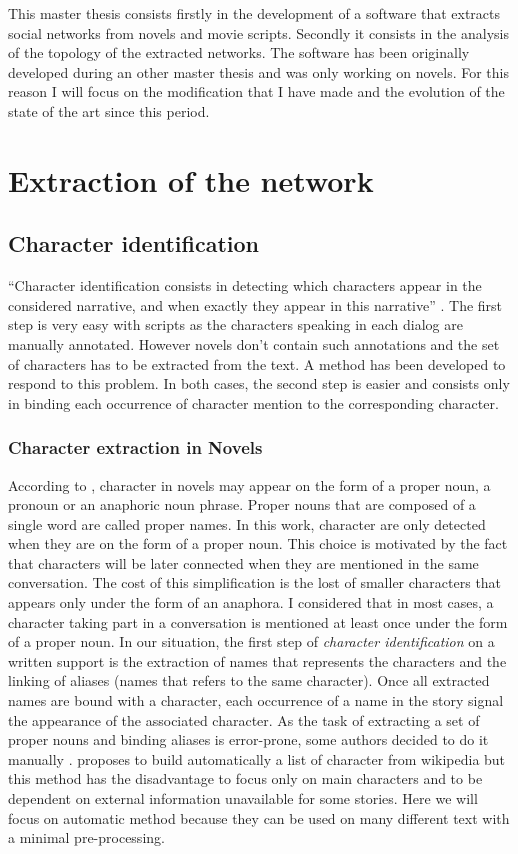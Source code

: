 \documentclass[a4paper, 12pt]{report}
\begin{document}
This master thesis consists firstly in the development of a software that extracts social networks from novels and movie scripts. Secondly it consists in the analysis of the topology of the extracted networks. The software has been originally developed during an other master thesis \citep{original} and was only working on novels. For this reason I will focus on the modification that I have made and the evolution of the state of the art since this period. 


\chapter{Extraction of the network}
\section{Character identification}
``Character identification consists in detecting which characters appear in the considered narrative, and when exactly they appear in this narrative'' \citep{fiction}. The first step is very easy with scripts as the characters speaking in each dialog are manually annotated.
However novels don't contain such annotations and the set of characters has to be extracted from the text. A method has been developed to respond to this problem. In both cases, the second step is easier and consists only in binding each occurrence of character mention to the corresponding character.

\subsection{Character extraction in Novels}
According to \cite{fiction},  character in novels may appear on the form of a proper noun, a pronoun or an anaphoric noun phrase. Proper nouns that are composed of a single word are called proper names. In this work, character are only detected when they are on the form of a proper noun. This choice is motivated by the fact that characters will be later connected when they are mentioned in the same conversation. The cost of this simplification is the lost of smaller characters that appears only under the form of an anaphora. I considered that in most cases, a character taking part in a conversation is mentioned at least once under the form of a proper noun. In our situation, the first step of \textit{character identification} on a written support is the extraction of names that represents the characters and the linking of aliases (names that refers to the same character). Once all extracted names are bound with a character, each occurrence of a name in the story signal the appearance of the associated character. As the task of extracting a set of proper nouns and binding aliases is error-prone, some authors decided to do it manually \citep{agarwal-etal-2013-automatic}.  \cite{he-etal-2013-identification} proposes to build automatically a list of character from wikipedia but this method has the disadvantage to focus only on main characters and to be dependent on external information unavailable for some stories.  Here we will focus on automatic method because they can be used on many different text with a minimal pre-processing.\\
\end{document}
